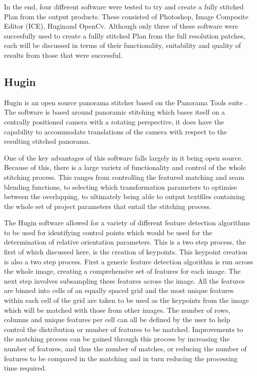 In the end, four different software were tested to try and create a fully stitched Plan from the output products. These consisted of Photoshop, Image Composite Editor (ICE), Huginand OpenCv. Although only three of these software were succesfully used to create a fullly stitched Plan from the full resolution patches, each will be discussed in terms of their functionality, suitability and quality of results from those that were successful.

\subsection{Hugin}
\label{sec:Hugin}
Hugin is an open source panorama stitcher based on the Panorama Tools suite \cite{Hugin2019}. The software is based around panoramic stitching which bases itself on a centrally positioned camera with a rotating perspective, it does have the capability to accommodate translations of the camera with respect to the resulting stitched panorama.

One of the key advantages of this software falls largely in it being open source. Because of this, there is a large varietz of functionality and control of the whole stitching process. This ranges from controlling the featured matching and seam blending functions, to selecting which transformation parameters to optimise between the overlapping, to ultimately being able to output textfiles containing the whole set of project parameters that entail the stitching process.

	The Hugin software allowed for a variety of different feature detection algorithms to be used for identifying control points which would be used for the determination of relative orientation parameters. This is a two step process, the first of which discussed here, is the creation of keypoints. This keypoint creation is also a two step process. First a generic feature detection algorithm is run across the whole image, creating a comprehensive set of features for each image. The next step involves subsampling these features across the image. All the features are binned into cells of an equally spaced grid and the most unique features within each cell of the grid are taken to be used as the keypoints from the image which will be matched with those from other images. The number of rows, columns and unique features per cell can all be defined by the user to help control the distribution or number of features to be matched. Improvements to the matching process can be gained through this process by increasing the number of features, and thus the number of matches, or reducing the number of features to be compared in the matching and in turn reducing the processing time required.

